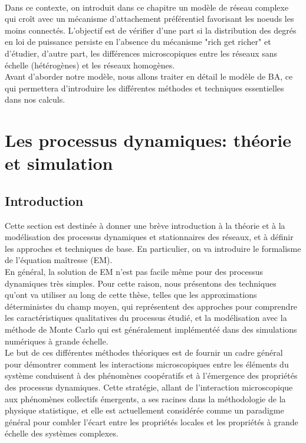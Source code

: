 \\
Dans ce contexte, on introduit dans ce chapitre un modèle de réseau  complexe qui croît avec un mécanisme 
d'attachement préférentiel favorisant les noeuds les moins connectés.
L'objectif est de vérifier d'une part si la distribution des degrés en loi de puissance persiste en l'absence du 
mécanisme "rich get richer" et d'étudier, d'autre part,  les différences microscopiques entre les 
réseaux sans échelle (hétérogènes) et les réseaux homogènes. \\
Avant d'aborder notre modèle, nous allons traiter en détail le modèle de BA, ce qui permettera d'introduire les différentes
méthodes et techniques essentielles dans nos calculs.   


\section{Les processus dynamiques: théorie et simulation}

\subsection{Introduction}

Cette section est destinée à  donner une brève introduction à la théorie et à la modélisation des processus dynamiques et stationnaires des réseaux, et à définir les approches et techniques de base. En particulier, on va introduire le formalisme de l'équation maîtresse (EM).\\
En général, la solution de EM n'est pas facile même pour des processus dynamiques très simples. Pour cette raison, 
nous présentons des techniques qu'ont va utiliser au long de cette thèse, telles que les approximations déterministes du champ moyen, qui représentent  des approches pour comprendre les caractéristiques qualitatives du processus étudié, et la modélisation avec la méthode de Monte Carlo qui est généralement implémentéé dans des simulations numériques à grande échelle.\\ 
Le but de ces différentes méthodes théoriques est de fournir un cadre général pour démontrer comment les interactions
microscopiques entre les éléments du système conduisent à des phénomènes coopératifs et à l'émergence des propriétés 
des processus dynamiques. Cette stratégie, allant de l'interaction microscopique aux phénomènes collectifs émergents,
a ses racines dans la méthodologie de la physique statistique,  et elle est actuellement
considérée comme un paradigme général pour combler l'écart entre les propriétés locales et les propriétés à grande échelle des systèmes complexes.
